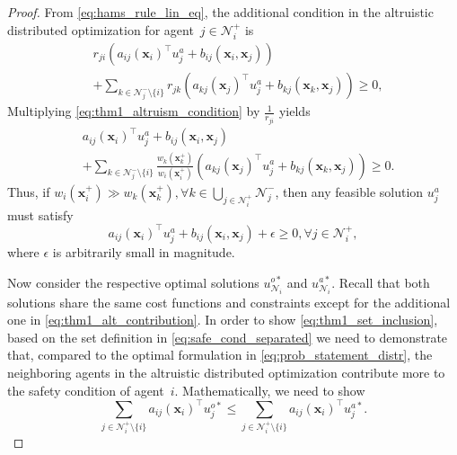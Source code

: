 \documentclass[letterpaper, 10 pt, conference]{ieeeconf}  %
\theoremstyle{plain}
\begin{document}
\begin{proof}
     From \eqref{eq:hams_rule_lin_eq}, the additional condition in the altruistic distributed optimization for agent~$j \in \mathcal{N}_i^+$ is
    \begin{equation}\label{eq:thm1_altruism_condition}
       \begin{aligned}
            &r_{ji} (a_{ij}(\mathbf{x}_i)^\top u_j^a + b_{ij}(\mathbf{x}_i,\mathbf{x}_j)) \\ 
            &+ \sum_{k \in \mathcal{N}_j^- \setminus \{i\}} r_{jk} \left(a_{kj}(\mathbf{x}_j)^\top u_j^a + b_{kj}(\mathbf{x}_k,\mathbf{x}_j)\right) \geq 0, 
       \end{aligned}
    \end{equation}
    Multiplying \eqref{eq:thm1_altruism_condition} by $\frac{1}{r_{ji}}$ yields
    \begin{equation*}
      \begin{aligned}
           & a_{ij}(\mathbf{x}_i)^\top u_j^a + b_{ij}(\mathbf{x}_i,\mathbf{x}_j) \\ 
            & + \sum_{k \in \mathcal{N}_j^-\setminus \{i\}} \frac{w_k(\mathbf{x}_k^+)}{w_i(\mathbf{x}_i^+)} \left(a_{kj}(\mathbf{x}_j)^\top u_j^a + b_{kj}(\mathbf{x}_k,\mathbf{x}_j)\right) \geq 0. 
       \end{aligned}
    \end{equation*}
    Thus, if $w_i(\mathbf{x}_i^+) \gg w_k(\mathbf{x}_k^+), \forall k \in \bigcup_{j \in \mathcal{N}_i^+} \mathcal{N}_j^-$, then any feasible solution $u_j^a$ must satisfy
    \begin{equation} \label{eq:thm1_alt_contribution}
        a_{ij}(\mathbf{x}_i)^\top u_j^a + b_{ij}(\mathbf{x}_i,\mathbf{x}_j) + \epsilon \geq 0, \forall j \in  \mathcal{N}_i^+,
    \end{equation}
    where $\epsilon$ is arbitrarily small in magnitude. 
    
    Now consider the respective optimal solutions $u_{\mathcal{N}_i}^{o*}$ and $u_{\mathcal{N}_i}^{a*}$. Recall that both solutions share the same cost functions and constraints except for the additional one in \eqref{eq:thm1_alt_contribution}.  In order to show \eqref{eq:thm1_set_inclusion}, based on the set definition in \eqref{eq:safe_cond_separated} we need to demonstrate that, compared to the optimal formulation in \eqref{eq:prob_statement_distr}, the neighboring agents in the altruistic distributed optimization contribute more to the safety condition of agent~$i$. Mathematically, we need to show
    \begin{equation} \label{eq:thm1_key_inequality}
        \sum_{j \in \mathcal{N}_i^+ \setminus \{i\}} a_{ij}(\mathbf{x}_i)^\top u_j^{o*}  \leq \sum_{j \in \mathcal{N}_i^+ \setminus \{i\}} a_{ij}(\mathbf{x}_i)^\top u_j^{a*}.
    \end{equation}
    

\end{proof}
\end{document}

